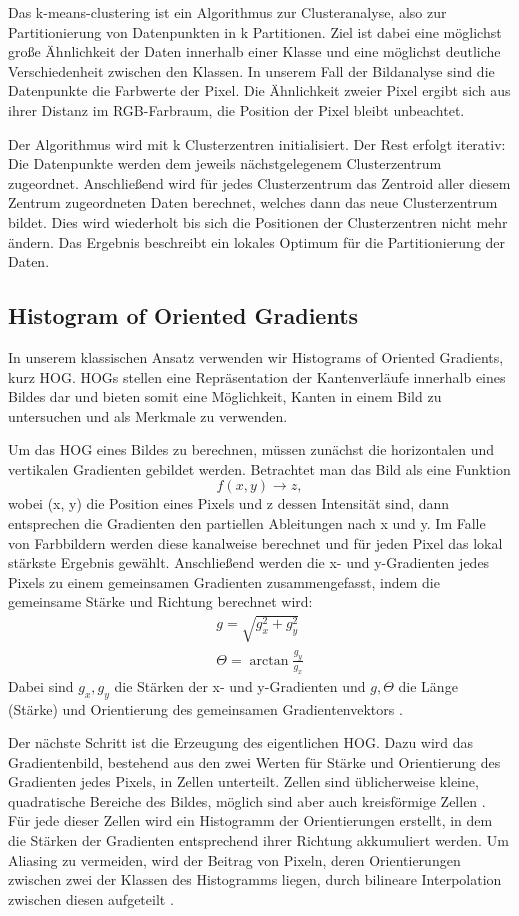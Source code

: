 \documentclass[11pt,a4paper]{article}
\begin{document}
Das k-means-clustering ist ein Algorithmus zur Clusteranalyse, also zur Partitionierung von Datenpunkten in k Partitionen. Ziel ist dabei eine möglichst große Ähnlichkeit der Daten innerhalb einer Klasse und eine möglichst deutliche Verschiedenheit zwischen den Klassen. In unserem Fall der Bildanalyse sind die Datenpunkte die Farbwerte der Pixel. Die Ähnlichkeit zweier Pixel ergibt sich aus ihrer Distanz im RGB-Farbraum, die Position der Pixel bleibt unbeachtet.

Der Algorithmus wird mit k Clusterzentren initialisiert. Der Rest erfolgt iterativ: Die Datenpunkte werden dem jeweils nächstgelegenem Clusterzentrum zugeordnet. Anschließend wird für jedes Clusterzentrum das Zentroid aller diesem Zentrum zugeordneten Daten berechnet, welches dann das neue Clusterzentrum bildet. Dies wird wiederholt bis sich die Positionen der Clusterzentren nicht mehr ändern. Das Ergebnis beschreibt ein lokales Optimum für die Partitionierung der Daten.


\subsection{Histogram of Oriented Gradients}
\label{subsec:HOG_Basics}
In unserem klassischen Ansatz verwenden wir Histograms of Oriented Gradients, kurz HOG. HOGs stellen eine Repräsentation der Kantenverläufe innerhalb eines Bildes dar und bieten somit eine Möglichkeit, Kanten in einem Bild zu untersuchen und als Merkmale zu verwenden.

Um das HOG eines Bildes zu berechnen, müssen zunächst die horizontalen und vertikalen Gradienten gebildet werden. Betrachtet man das Bild als eine Funktion $$f(x, y)\rightarrow z,$$ wobei (x, y) die Position eines Pixels und z dessen Intensität sind, dann entsprechen die Gradienten den partiellen Ableitungen nach x und y. Im Falle von Farbbildern werden diese kanalweise berechnet und für jeden Pixel das lokal stärkste Ergebnis gewählt. Anschließend werden die x- und y-Gradienten jedes Pixels zu einem gemeinsamen Gradienten zusammengefasst, indem die gemeinsame Stärke und Richtung berechnet wird:
\begin{align*}
g = \sqrt{g_x^2+g_y^2} \\
\Theta = \arctan{\frac{g_y}{g_x}}
\end{align*}
Dabei sind $g_x, g_y$ die Stärken der x- und y-Gradienten und $g, \Theta$ die Länge (Stärke) und Orientierung des gemeinsamen Gradientenvektors \cite{ocv_hog}.

Der nächste Schritt ist die Erzeugung des eigentlichen HOG. Dazu wird das Gradientenbild, bestehend aus den zwei Werten für Stärke und Orientierung des Gradienten jedes Pixels, in Zellen unterteilt. Zellen sind üblicherweise kleine, quadratische Bereiche des Bildes, möglich sind aber auch kreisförmige Zellen \cite{Dalal}. Für jede dieser Zellen wird ein Histogramm der Orientierungen erstellt, in dem die Stärken der Gradienten entsprechend ihrer Richtung akkumuliert werden. Um Aliasing zu vermeiden, wird der Beitrag von Pixeln, deren Orientierungen zwischen zwei der Klassen des Histogramms liegen, durch bilineare Interpolation zwischen diesen aufgeteilt \cite{Dalal}.
\end{document}
